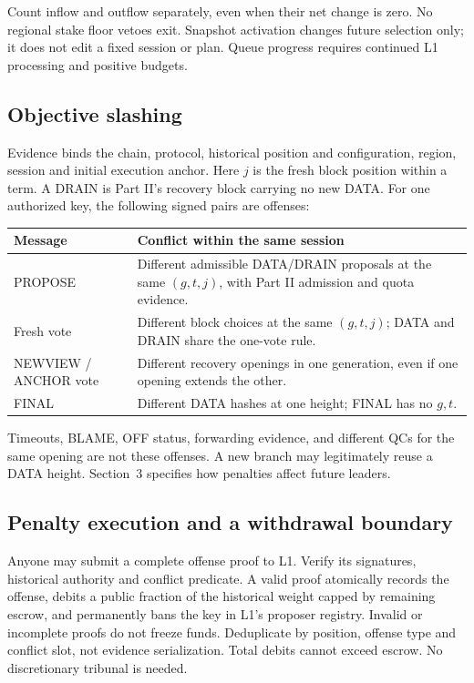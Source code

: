 \documentclass[11pt,a4paper]{article}
\begin{document}
Count inflow and outflow separately, even when their net change is zero.
No regional stake floor vetoes exit. Snapshot activation changes future
selection only; it does not edit a fixed session or plan. Queue progress
requires continued L1 processing and positive budgets.

\subsection{Objective slashing}
Evidence binds the chain, protocol, historical position and configuration,
region, session and initial execution anchor. Here $j$ is the fresh block
position within a term. A DRAIN is Part II's recovery block carrying no
new DATA. For one authorized key, the following signed pairs are offenses:

\begin{tabularx}{\linewidth}{@{}>{\raggedright\arraybackslash}p{.24\linewidth}Y@{}}\toprule
Message & Conflict within the same session\\\midrule
PROPOSE & Different admissible DATA/DRAIN proposals at the same $(g,t,j)$,
with Part II admission and quota evidence.\\
Fresh vote & Different block choices at the same $(g,t,j)$; DATA and DRAIN
share the one-vote rule.\\
NEWVIEW / ANCHOR vote & Different recovery openings in one generation,
even if one opening extends the other.\\
FINAL & Different DATA hashes at one height; FINAL has no $g,t$.\\\bottomrule
\end{tabularx}

Timeouts, BLAME, OFF status, forwarding evidence, and different QCs for the
same opening are not these offenses. A new branch may legitimately reuse
a DATA height. Section~3 specifies how penalties affect future leaders.

\newpage
\subsection{Penalty execution and a withdrawal boundary}
Anyone may submit a complete offense proof to L1. Verify its signatures,
historical authority and conflict predicate. A valid proof atomically
records the offense, debits a public fraction of the historical weight
capped by remaining escrow, and permanently bans the key in L1's proposer
registry. Invalid or incomplete proofs do not freeze funds. Deduplicate
by position, offense type and conflict slot, not evidence serialization.
Total debits cannot exceed escrow. No discretionary tribunal is needed.
\end{document}
